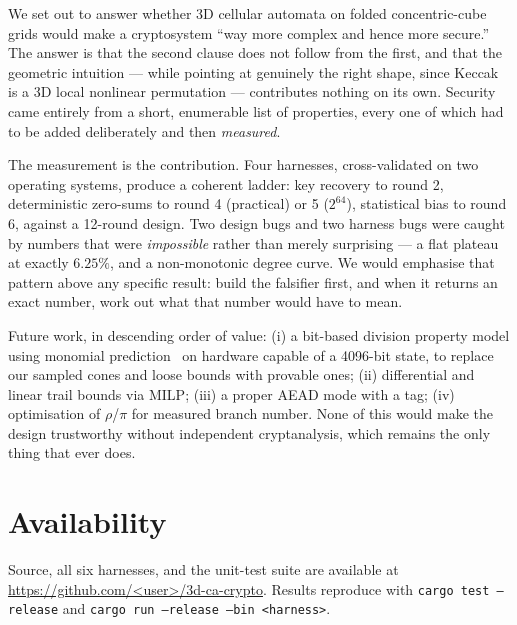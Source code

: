 \documentclass[11pt,a4paper]{article}
\theoremstyle{plain}
\theoremstyle{definition}
\theoremstyle{remark}
\begin{document}
We set out to answer whether 3D cellular automata on folded concentric-cube grids
would make a cryptosystem ``way more complex and hence more secure.'' The answer is
that the second clause does not follow from the first, and that the geometric
intuition --- while pointing at genuinely the right shape, since Keccak is a 3D local
nonlinear permutation --- contributes nothing on its own. Security came entirely from
a short, enumerable list of properties, every one of which had to be added
deliberately and then \emph{measured}.

The measurement is the contribution. Four harnesses, cross-validated on two operating
systems, produce a coherent ladder: key recovery to round 2, deterministic zero-sums
to round 4 (practical) or 5 ($2^{64}$), statistical bias to round 6, against a
12-round design. Two design bugs and two harness bugs were caught by numbers that were
\emph{impossible} rather than merely surprising --- a flat plateau at exactly $6.25\%$,
and a non-monotonic degree curve. We would emphasise that pattern above any specific
result: build the falsifier first, and when it returns an exact number, work out what
that number would have to mean.

Future work, in descending order of value: (i) a bit-based division property model
using monomial prediction~\cite{hu20} on hardware capable of a 4096-bit state, to
replace our sampled cones and loose bounds with provable ones; (ii) differential and
linear trail bounds via MILP; (iii) a proper AEAD mode with a tag; (iv) optimisation
of $\rho$/$\pi$ for measured branch number. None of this would make the design
trustworthy without independent cryptanalysis, which remains the only thing that ever
does.

\section*{Availability}

Source, all six harnesses, and the unit-test suite are available at
\url{https://github.com/<user>/3d-ca-crypto}. Results reproduce with
\texttt{cargo test --release} and \texttt{cargo run --release --bin <harness>}.
\end{document}
